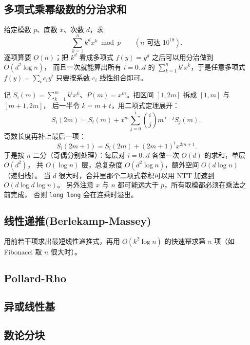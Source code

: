 \documentclass[11pt,a4paper,twocolumn]{ctexart}  %
\begin{document}
\subsection{多项式乘幂级数的分治求和}
给定模数 $p$、底数 $x$、次数 $d$，求
\[
    \sum_{k=1}^{n} k^d x^k \bmod p \qquad (n \text{ 可达 } 10^{18}).
\]
逐项算要 $O(n)$；把 $k^d$ 看成多项式 $f(y)=y^d$ 之后可以用分治做到 $O(d^2\log n)$，
而且一次就能算出所有 $i=0..d$ 的 $\sum_{k=1}^{n} k^i x^k$，于是任意多项式
$f(y)=\sum_i c_i y^i$ 只要按系数 $c_i$ 线性组合即可。

记 $S_i(m)=\sum_{k=1}^{m} k^i x^k$、$P(m)=x^m$。把区间 $[1,2m]$ 拆成 $[1,m]$ 与 $[m+1,2m]$，
后一半令 $k=m+t$，用二项式定理展开：
\[
    S_i(2m) = S_i(m) + x^m \sum_{j=0}^{i} \binom{i}{j} m^{\,i-j} S_j(m),
\]
奇数长度再补上最后一项：
\[
    S_i(2m+1) = S_i(2m) + (2m+1)^i x^{2m+1}.
\]
于是按 $n$ 二分（奇偶分别处理）：每层对 $i=0..d$ 各做一次 $O(d)$ 的求和，单层 $O(d^2)$，
共 $O(\log n)$ 层，总复杂度 $O(d^2\log n)$，额外空间 $O(d\log n)$（递归栈）。
当 $d$ 很大时，合并里那个二项式卷积可以用 NTT 加速到 $O(d\log d\log n)$。
另外注意 $x$ 与 $n$ 都可能远大于 $p$，所有取模都必须在乘法之前完成，
否则 \texttt{long long} 会在连乘时溢出。


\subsection{线性递推(Berlekamp-Massey)}
用前若干项求出最短线性递推式，再用 $O(k^2\log n)$ 的快速幂求第 $n$ 项（如 Fibonacci 取 $n$ 很大时）。


\subsection{Pollard-Rho}


\subsection{异或线性基}


\subsection{数论分块}
\end{document}
